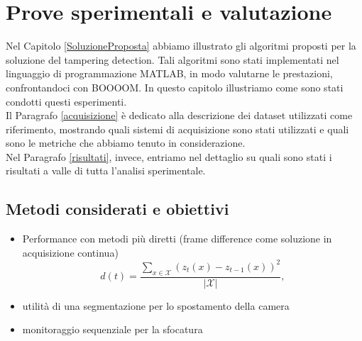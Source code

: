 \chapter{Prove sperimentali e valutazione}
\label{ProveSperimentali}
\thispagestyle{empty}

\vspace{0.5cm}
\noindent Nel Capitolo \ref{SoluzioneProposta} abbiamo illustrato gli algoritmi proposti per la soluzione del tampering detection.
Tali algoritmi sono stati implementati nel linguaggio di programmazione MATLAB, in modo valutarne le prestazioni, confrontandoci con BOOOOM. 
In questo capitolo illustriamo come sono stati condotti questi esperimenti.\\
Il Paragrafo \ref{acquisizione} \`e dedicato alla descrizione dei dataset utilizzati come riferimento, mostrando quali sistemi di acquisizione sono stati utilizzati e quali sono le metriche che abbiamo tenuto in considerazione.\\
Nel Paragrafo \ref{risultati}, invece, entriamo nel dettaglio su quali sono stati i risultati a valle di tutta l'analisi sperimentale. 
\section{Metodi considerati e obiettivi}
\begin{itemize}
	\item Performance con metodi pi\`u diretti (frame difference come soluzione in acquisizione continua)
	\[d(t) = \frac{\sum_{x \in \mathcal{X}}(z_t(x) - z_{t-1}(x))^2}{|\mathcal{X}|},\]
	\item utilit\`a di una segmentazione per lo spostamento della camera
	\item monitoraggio sequenziale per la sfocatura
\end{itemize}
